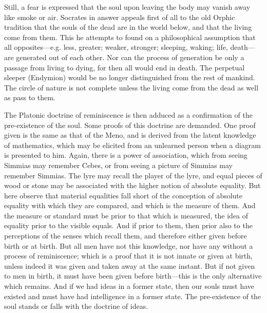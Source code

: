\documentclass[11pt,letter]{article}
\begin{document}
\par  Still, a fear is expressed that the soul upon leaving the body may vanish away like smoke or air. Socrates in answer appeals first of all to the old Orphic tradition that the souls of the dead are in the world below, and that the living come from them. This he attempts to found on a philosophical assumption that all opposites—e.g. less, greater; weaker, stronger; sleeping, waking; life, death—are generated out of each other. Nor can the process of generation be only a passage from living to dying, for then all would end in death. The perpetual sleeper (Endymion) would be no longer distinguished from the rest of mankind. The circle of nature is not complete unless the living come from the dead as well as pass to them.

\par  The Platonic doctrine of reminiscence is then adduced as a confirmation of the pre-existence of the soul. Some proofs of this doctrine are demanded. One proof given is the same as that of the Meno, and is derived from the latent knowledge of mathematics, which may be elicited from an unlearned person when a diagram is presented to him. Again, there is a power of association, which from seeing Simmias may remember Cebes, or from seeing a picture of Simmias may remember Simmias. The lyre may recall the player of the lyre, and equal pieces of wood or stone may be associated with the higher notion of absolute equality. But here observe that material equalities fall short of the conception of absolute equality with which they are compared, and which is the measure of them. And the measure or standard must be prior to that which is measured, the idea of equality prior to the visible equals. And if prior to them, then prior also to the perceptions of the senses which recall them, and therefore either given before birth or at birth. But all men have not this knowledge, nor have any without a process of reminiscence; which is a proof that it is not innate or given at birth, unless indeed it was given and taken away at the same instant. But if not given to men in birth, it must have been given before birth—this is the only alternative which remains. And if we had ideas in a former state, then our souls must have existed and must have had intelligence in a former state. The pre-existence of the soul stands or falls with the doctrine of ideas.
\end{document}
